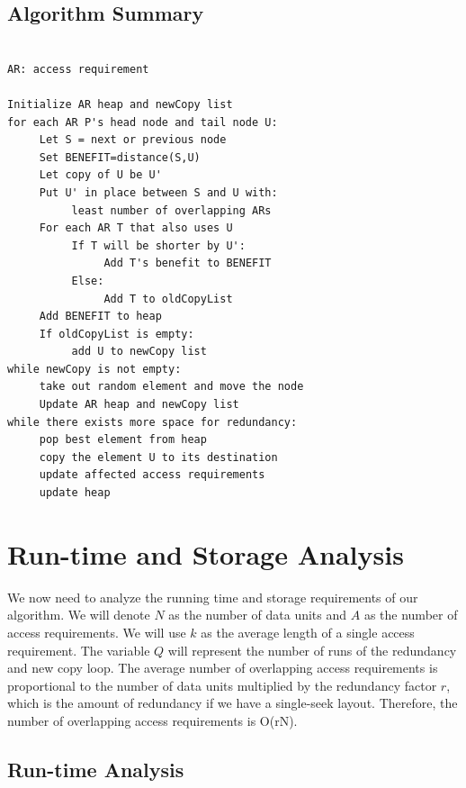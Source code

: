 \documentclass[conference]{acmsiggraph}
\begin{document}
\subsection{Algorithm Summary}

\begin{verbatim}

AR: access requirement

Initialize AR heap and newCopy list
for each AR P's head node and tail node U:
     Let S = next or previous node
     Set BENEFIT=distance(S,U)
     Let copy of U be U'
     Put U' in place between S and U with:
          least number of overlapping ARs
     For each AR T that also uses U
          If T will be shorter by U':
               Add T's benefit to BENEFIT
          Else:
               Add T to oldCopyList
     Add BENEFIT to heap
     If oldCopyList is empty:
          add U to newCopy list
while newCopy is not empty:
     take out random element and move the node
     Update AR heap and newCopy list
while there exists more space for redundancy:
     pop best element from heap
     copy the element U to its destination
     update affected access requirements
     update heap

\end{verbatim}

\section{Run-time and Storage Analysis}

We now need to analyze the running time and storage requirements of our algorithm. We will denote $N$ as the number of data units and $A$ as the number of access requirements. We will use $k$ as the average length of a single access requirement. The variable $Q$ will represent the number of runs of the redundancy and new copy loop. The average number of overlapping access requirements is proportional to the number of data units multiplied by the redundancy factor $r$, which is the amount of redundancy if we have a single-seek layout. Therefore, the number of overlapping access requirements is O(rN). 

\subsection{Run-time Analysis}
\end{document}
